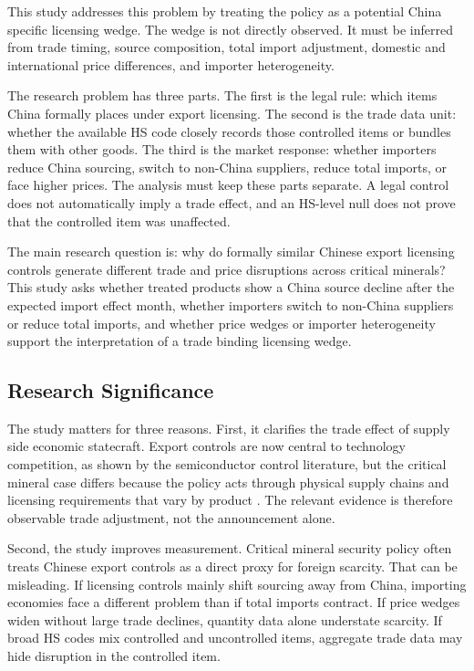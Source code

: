 \documentclass[12pt,a4paper]{article}
\numberwithin{equation}{section}
\begin{document}
This study addresses this problem by treating the policy as a potential China specific licensing wedge. The wedge is not directly observed. It must be inferred from trade timing, source composition, total import adjustment, domestic and international price differences, and importer heterogeneity.

The research problem has three parts. The first is the legal rule: which items China formally places under export licensing. The second is the trade data unit: whether the available HS code closely records those controlled items or bundles them with other goods. The third is the market response: whether importers reduce China sourcing, switch to non-China suppliers, reduce total imports, or face higher prices. The analysis must keep these parts separate. A legal control does not automatically imply a trade effect, and an HS-level null does not prove that the controlled item was unaffected.

The main research question is: why do formally similar Chinese export licensing controls generate different trade and price disruptions across critical minerals? This study asks whether treated products show a China source decline after the expected import effect month, whether importers switch to non-China suppliers or reduce total imports, and whether price wedges or importer heterogeneity support the interpretation of a trade binding licensing wedge.

\subsection{Research Significance}

The study matters for three reasons. First, it clarifies the trade effect of supply side economic statecraft. Export controls are now central to technology competition, as shown by the semiconductor control literature, but the critical mineral case differs because the policy acts through physical supply chains and licensing requirements that vary by product \citep{bown2020semiconductor,bown2024semiconductors}. The relevant evidence is therefore observable trade adjustment, not the announcement alone.

Second, the study improves measurement. Critical mineral security policy often treats Chinese export controls as a direct proxy for foreign scarcity. That can be misleading. If licensing controls mainly shift sourcing away from China, importing economies face a different problem than if total imports contract. If price wedges widen without large trade declines, quantity data alone understate scarcity. If broad HS codes mix controlled and uncontrolled items, aggregate trade data may hide disruption in the controlled item.
\end{document}
